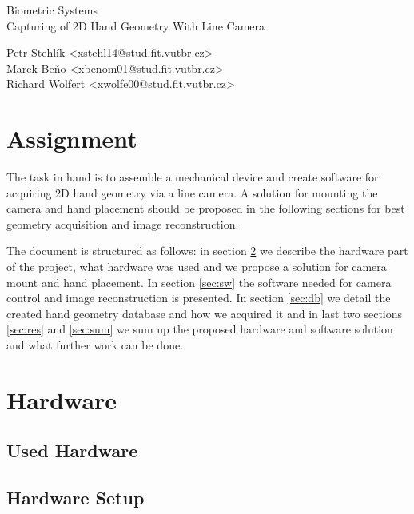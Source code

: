 \documentclass[11pt,a4paper]{article}
\begin{document}
\begin{center}
	\LARGE{Biometric Systems}\\
	\Large{Capturing of 2D Hand Geometry With Line Camera}
	\vspace{0.5cm}

    \begin{centering}
    \small{
        Petr Stehlík <xstehl14@stud.fit.vutbr.cz>\\
        Marek Beňo <xbenom01@stud.fit.vutbr.cz>\\
        Richard Wolfert <xwolfe00@stud.fit.vutbr.cz>\\
        }
    \end{centering}

	\vspace{0.2cm}

\end{center}

\section{Assignment}
The task in hand is to assemble a mechanical device and create software for acquiring 2D hand geometry via a line camera. A solution for mounting the camera and hand placement should be proposed in the following sections for best geometry acquisition and image reconstruction.

The document is structured as follows: in section \ref{sec:hw} we describe the hardware part of the project, what hardware was used and we propose a solution for camera mount and hand placement. In section \ref{sec:sw} the software needed for camera control and image reconstruction is presented. In section \ref{sec:db} we detail the created hand geometry database and how we acquired it and in last two sections \ref{sec:res} and \ref{sec:sum} we sum up the proposed hardware and software solution and what further work can be done.

\section{Hardware}
\label{sec:hw}
\subsection{Used Hardware}
\subsection{Hardware Setup}
\end{document}
